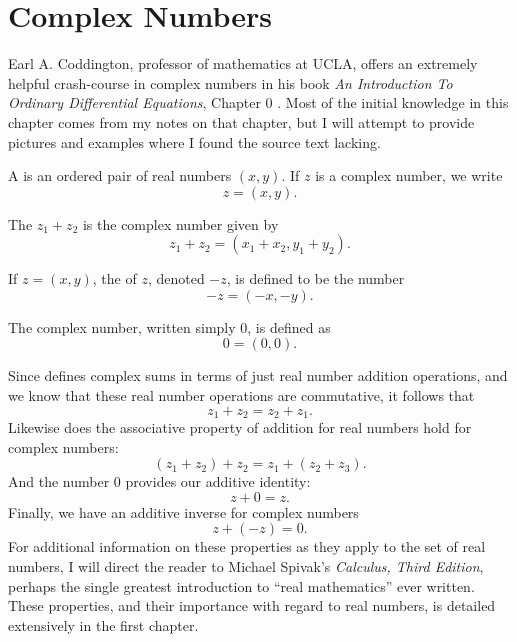 \chapter{Complex Numbers}\label{ch:complex}
Earl A. Coddington, professor of mathematics at UCLA, offers an extremely helpful crash-course in complex numbers in his book \emph{An Introduction To Ordinary Differential Equations}, Chapter 0 \cite{coddington}.
Most of the initial knowledge in this chapter comes from my notes on that chapter, but I will attempt to provide pictures and examples where I found the source text lacking.
\begin{defn}
  A  is an ordered pair of real numbers $(x, y)$.
  If $z$ is a complex number, we write
  \begin{equation}
    z = (x,y).
  \end{equation}
\end{defn}
\begin{defn}
  The  $z_1+z_2$ is the complex number given by
  \begin{equation}
    z_1 + z_2 = (x_1 + x_2, y_1 + y_2).
    \label{eq:complexsum}
  \end{equation}
\end{defn}
\begin{defn}
  If $z=(x,y)$, the  of $z$, denoted $-z$, is defined to be the number
  \begin{equation}
    -z = (-x, -y).
  \end{equation}
\end{defn}
\begin{defn}
  The  complex number, written simply 0, is defined as
  \begin{equation}
    0 = (0, 0).
  \end{equation}
\end{defn}
Since  defines complex sums in terms of just real number addition operations, and we know that these real number operations are commutative, it follows that
\begin{equation}
  z_1+z_2 = z_2 + z_1.
\end{equation}
Likewise does the associative property of addition for real numbers hold for complex numbers:
\begin{equation}
  (z_1 + z_2) + z_2 = z_1 + (z_2 + z_3).
\end{equation}
And the number $0$ provides our additive identity:
\begin{equation}
  z + 0 = z.
\end{equation}
Finally, we have an additive inverse for complex numbers
\begin{equation}
  z+(-z)=0.
\end{equation}
For additional information on these properties as they apply to the set of real numbers, I will direct the reader to Michael Spivak's \emph{Calculus, Third Edition}, perhaps the single greatest introduction to ``real mathematics'' ever written.
These properties, and their importance with regard to real numbers, is detailed extensively in the first chapter.
